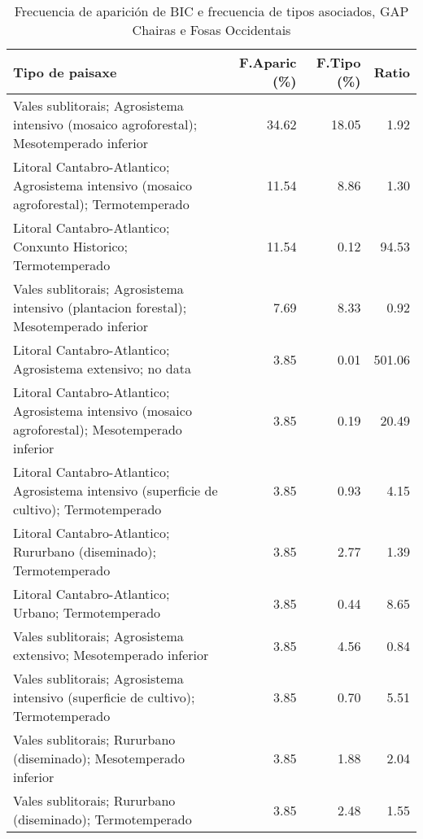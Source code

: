 \begin{table}[p]
\centering
\caption{Frecuencia de aparición de BIC e frecuencia de tipos asociados, GAP Chairas e Fosas Occidentais} 
\label{vbic11}
\begin{tabular}{lrrr}
  \hline
Tipo de paisaxe & F.Aparic (\%) & F.Tipo (\%) & Ratio \\ 
  \hline
Vales sublitorais; Agrosistema intensivo (mosaico agroforestal); Mesotemperado inferior & 34.62 & 18.05 & 1.92 \\ 
  Litoral Cantabro-Atlantico; Agrosistema intensivo (mosaico agroforestal); Termotemperado & 11.54 & 8.86 & 1.30 \\ 
  Litoral Cantabro-Atlantico; Conxunto Historico; Termotemperado & 11.54 & 0.12 & 94.53 \\ 
  Vales sublitorais; Agrosistema intensivo (plantacion forestal); Mesotemperado inferior & 7.69 & 8.33 & 0.92 \\ 
  Litoral Cantabro-Atlantico; Agrosistema extensivo; no data & 3.85 & 0.01 & 501.06 \\ 
  Litoral Cantabro-Atlantico; Agrosistema intensivo (mosaico agroforestal); Mesotemperado inferior & 3.85 & 0.19 & 20.49 \\ 
  Litoral Cantabro-Atlantico; Agrosistema intensivo (superficie de cultivo); Termotemperado & 3.85 & 0.93 & 4.15 \\ 
  Litoral Cantabro-Atlantico; Rururbano (diseminado); Termotemperado & 3.85 & 2.77 & 1.39 \\ 
  Litoral Cantabro-Atlantico; Urbano; Termotemperado & 3.85 & 0.44 & 8.65 \\ 
  Vales sublitorais; Agrosistema extensivo; Mesotemperado inferior & 3.85 & 4.56 & 0.84 \\ 
  Vales sublitorais; Agrosistema intensivo (superficie de cultivo); Termotemperado & 3.85 & 0.70 & 5.51 \\ 
  Vales sublitorais; Rururbano (diseminado); Mesotemperado inferior & 3.85 & 1.88 & 2.04 \\ 
  Vales sublitorais; Rururbano (diseminado); Termotemperado & 3.85 & 2.48 & 1.55 \\ 
   \hline
\end{tabular}
\end{table}

